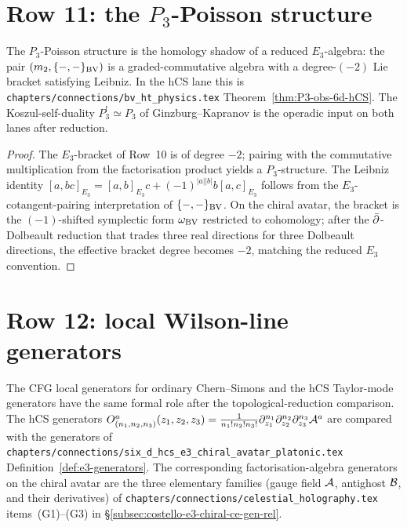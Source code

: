 \section{\texorpdfstring{Row 11: the $P_3$-Poisson structure}{Row 11: the P3-Poisson structure}}
\label{sec:cfg-row-11-p3-poisson}

\begin{theorem}
\label{thm:cfg-row-11}
The $P_3$-Poisson structure is the homology shadow of a reduced
$E_3$-algebra: the pair $(m_2,\{-,-\}_{\mathrm{BV}})$ is a
graded-commutative algebra with a degree-$(-2)$ Lie bracket satisfying
Leibniz. In the hCS lane this is
\texttt{chapters/connections/bv\_ht\_physics.tex}
Theorem~\ref{thm:P3-obs-6d-hCS}. The Koszul-self-duality $P_3^!\simeq P_3$
of Ginzburg--Kapranov is the operadic input on both lanes after
reduction.
\end{theorem}

\begin{proof}
The $E_3$-bracket of Row~10 is of degree $-2$; pairing with the
commutative multiplication from the factorisation product yields a
$P_3$-structure. The Leibniz identity
$[a, bc]_{E_3} = [a,b]_{E_3}c + (-1)^{|a||b|}b[a,c]_{E_3}$
follows from the $E_3$-cotangent-pairing interpretation of
$\{-,-\}_{\mathrm{BV}}$. On the chiral avatar, the bracket is the
$(-1)$-shifted symplectic form $\omega_{\mathrm{BV}}$ restricted to
cohomology; after the $\bar\partial$-Dolbeault reduction that trades three
real directions for three Dolbeault directions, the effective bracket
degree becomes $-2$, matching the reduced $E_3$ convention.
\end{proof}

\section{Row 12: local Wilson-line generators}
\label{sec:cfg-row-12-local-obs}

\begin{theorem}
\label{thm:cfg-row-12}
The CFG local generators for ordinary Chern--Simons and the hCS
Taylor-mode generators have the same formal role after the
topological-reduction comparison. The hCS generators
$O^a_{(n_1,n_2,n_3)}(z_1,z_2,z_3) = \frac{1}{n_1!n_2!n_3!}
\partial_{z_1}^{n_1}\partial_{z_2}^{n_2}\partial_{z_3}^{n_3}\mathcal{A}^a$
are compared with the generators of
\texttt{chapters/connections/six\_d\_hcs\_e3\_chiral\_avatar\_platonic.tex}
Definition~\ref{def:e3-generators}. The corresponding
factorisation-algebra generators on the chiral avatar are the three
elementary families (gauge field $\mathcal{A}$, antighost $\mathcal{B}$, and their
derivatives) of
\texttt{chapters/connections/celestial\_holography.tex}
items~(G1)--(G3) in \S\ref{subsec:costello-e3-chiral-ce-gen-rel}.
\end{theorem}

